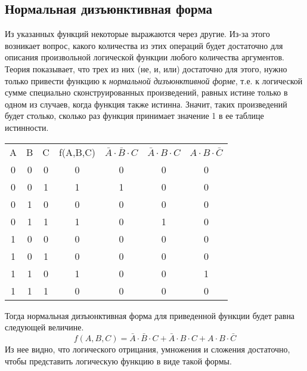 \documentclass[a4paper, fleqn]{article}
\begin{document}
	
	\subsection*{Нормальная дизъюнктивная форма}
	
	Из указанных функций некоторые выражаются через другие. Из-за этого возникает вопрос, какого количества из этих операций будет достаточно для описания произвольной логической функции любого количества аргументов. Теория показывает, что трех из них (не, и, или) достаточно для этого, нужно только привести функцию к \emph{нормальной дизъюнктивной форме}, т.е. к логической сумме специально сконструированных произведений, равных истине только в одном из случаев, когда функция также истинна. Значит, таких произведений будет столько, сколько раз функция принимает значение 1 в ее таблице истинности.
	
	\begin{tabular}{ccc|c|c|c|c}
		A&  B&  C&  f(A,B,C)&  $\bar{A}\cdot \bar{B}\cdot C$&  $\bar{A}\cdot B \cdot C$&  $A\cdot B \cdot \bar{C}$\\ 
		0&  0&  0&  0&  0&  0&  0\\ 
		0&  0&  1&  1&  1&  0&  0\\ 
		0&  1&  0&  0&  0&  0&  0\\ 
		0&  1&  1&  1&  0&  1&  0\\ 
		1&  0&  0&  0&  0&  0&  0\\ 
		1&  0&  1&  0&  0&  0&  0\\ 
		1&  1&  0&  1&  0&  0&  1\\ 
		1&  1&  1&  0&  0&  0&  0\\ 
	\end{tabular} 
	
	Тогда нормальная дизъюнктивная форма для приведенной функции будет равна следующей величине.
	\[f(A, B, C) = \bar{A}\cdot \bar{B}\cdot C + \bar{A}\cdot B \cdot C + A\cdot B \cdot \bar{C}\]
	Из нее видно, что логического отрицания, умножения и сложения достаточно, чтобы представить логическую функцию в виде такой формы.
	
\end{document}
